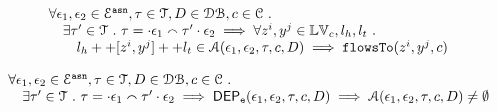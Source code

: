 %
\begin{thm}
\label{thm:alg_correct}
\[
\begin{array}{l}
  \forall \mathtt{\epsilon}_1, \mathtt{\epsilon}_2 \in \mathcal{E}^{\mathtt{{asn}}}, \mathtt{\tau} \in \mathcal{T}, D \in \mathcal{DB} , c \in \mathcal{C} ~.~
  \\ \quad 
   \exists \mathtt{\tau}' \in \mathcal{T} ~.~ \mathtt{\tau} = \cdot \mathtt{\epsilon}_1 \smallfrown \mathtt{\tau}' \cdot \mathtt{\epsilon}_2
   \implies    \forall  z^i, y^j \in \mathbb{LV}_c, l_h, l_t ~.~ 
  \\ \qquad 
   l_h ++ [z^i, y^j] ++ l_t \in \mathcal{A}(\mathtt{\epsilon}_1, \mathtt{\epsilon}_2, \mathtt{\tau}, c, D)
   \implies \mathtt{flowsTo}(z^i, y^j, c)
\end{array}
\]
\end{thm}
%
%
\begin{thm}
\label{thm:algeventdep_sound}
\[
\begin{array}{l}
  \forall \mathtt{\epsilon}_1, \mathtt{\epsilon}_2 \in \mathcal{E}^{\mathtt{{asn}}}, \mathtt{\tau} \in \mathcal{T}, D \in \mathcal{DB} , c \in \mathcal{C} ~.~
  \\ \quad 
   \exists \mathtt{\tau}' \in \mathcal{T} ~.~ \mathtt{\tau} = \cdot \mathtt{\epsilon}_1 \smallfrown \mathtt{\tau}' \cdot \mathtt{\epsilon}_2
  \implies \mathsf{DEP_{\mathtt{e}}}(\mathtt{\epsilon}_1, \mathtt{\epsilon}_2, \mathtt{\tau}, {c}, D)
   \implies
   \mathcal{A}(\mathtt{\epsilon}_1, \mathtt{\epsilon}_2, \mathtt{\tau}, c, D) \neq \emptyset
\end{array}
\]
\end{thm}
%
